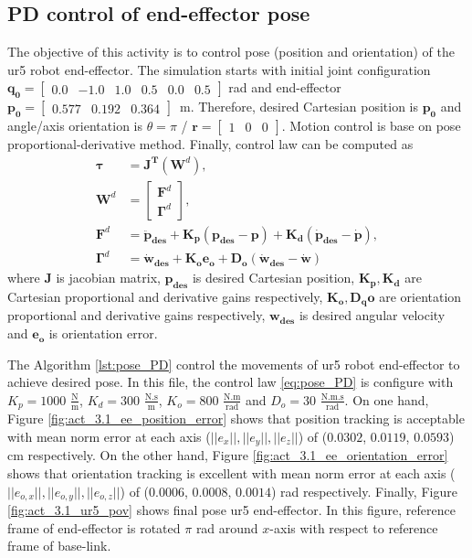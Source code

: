 \graphicspath{{images/act_3.1/}}
\subsection{PD control of end-effector pose}
The objective of this activity is to control pose (position and orientation) of the ur5 robot end-effector. The simulation starts with initial joint configuration $\mathbf{q_0}=\begin{bmatrix} 0.0 & -1.0 & 1.0 & 0.5 & 0.0 & 0.5 \end{bmatrix}$ rad and end-effector $\mathbf{p_0}=\begin{bmatrix}  0.577 &   0.192 &   0.364 \end{bmatrix}$~m. Therefore, desired Cartesian position is $\mathbf{p_0}$ and angle/axis orientation is  $\theta = \pi$ / $\mathbf{r}=\begin{bmatrix} 1 & 0 & 0 \end{bmatrix}$. Motion control is base on pose proportional-derivative method. Finally, control law can be computed as 
\begin{align}
	\boldsymbol{\tau} &= \mathbf{J^T} (\mathbf{W}^{d}), \label{eq:pose_PD}
	\\
	\mathbf{W}^{d} &=
	\begin{bmatrix}
	\mathbf{F}^{d} \\ \boldsymbol{\Gamma}^{d}
	\end{bmatrix}, 
	\nonumber \\
	\mathbf{F}^{d} &= \mathbf{\ddot{p}_{des}} + \mathbf{K_p (p_{des}-p)} + \mathbf{K_d (\dot{p}_{des}-\dot{p})}, 
	\nonumber \\
	\boldsymbol{\Gamma}^{d} &= \mathbf{\dot{w}_{des}} + \mathbf{K_o e_o} + \mathbf{D_o (\dot{w}_{des}-\dot{w})} \nonumber
\end{align}
\noindent where $\mathbf{J}$ is jacobian matrix, $\mathbf{p_{des}}$ is desired Cartesian position, $\mathbf{K_p, K_d}$ are Cartesian proportional and derivative gains respectively, $\mathbf{K_o, D_qo}$ are orientation proportional and derivative gains respectively, $\mathbf{w_{des}}$ is desired angular velocity and $\mathbf{e_o}$ is orientation error. \vspace{.5cm}

The Algorithm \ref{lst:pose_PD} control the movements of ur5 robot end-effector to achieve desired pose. In this file, the control law \ref{eq:pose_PD} is configure with ${K_{p}}=1000$ $\mathrm{\frac{N}{m}}$, $K_{d}= 300$ $\mathrm{\frac{N.s}{m}}$, ${K_{o}}=800$ $\mathrm{\frac{N.m}{rad}}$ and $D_{o}= 30$ $\mathrm{\frac{N.m.s}{rad}}$. On one hand, Figure \ref{fig:act_3.1_ee_position_error} shows that position tracking is acceptable with mean norm error at each axis ($||e_x||, ||e_y||, ||e_z||$) of ($0.0302$, $0.0119$, $0.0593$) cm respectively. On the other hand, Figure \ref{fig:act_3.1_ee_orientation_error} shows that orientation tracking is excellent with mean norm error at each axis ($||e_{o,x}||, ||e_{o,y}||, ||e_{o,z}||$) of ($0.0006$, $0.0008$, $0.0014$) rad respectively. Finally, Figure \ref{fig:act_3.1_ur5_pov} shows final pose ur5 end-effector. In this figure, reference frame of end-effector is rotated $\pi$ rad  around $x$-axis with respect to reference frame of base-link. \vspace{.5cm}


